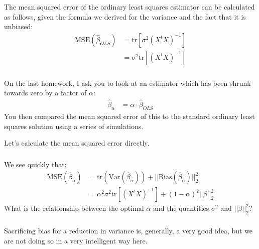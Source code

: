 \begin{frame}[fragile] \frametitle{}

The mean squared error of the ordinary least squares estimator can be
calculated as follows, given the formula we derived for the variance
and the fact that it is unbiased:
\begin{align*}
\text{MSE} (\widehat{\beta}_{OLS})
  &= \text{tr} \left[ \sigma^2 (X^t X)^{-1} \right] \\
  &= \sigma^2 \text{tr} \left[(X^t X)^{-1} \right]
\end{align*}

\end{frame}

\begin{frame}[fragile] \frametitle{}

On the last homework, I ask you to look at an estimator which
has been shrunk towards zero by a factor of $\alpha$:
\begin{align*}
\mathbb{\widehat{\beta}}_\alpha &= \alpha \cdot \widehat{\beta}_{OLS}
\end{align*}
You then compared the mean squared error of this to the standard
ordinary least squares solution using a series of simulations.

\pause Let's calculate the mean squared error directly.

\end{frame}

\begin{frame}[fragile] \frametitle{}

We see quickly that:
\begin{align*}
\text{MSE} (\widehat{\beta}_{\alpha})
  &= \text{tr} (\text{Var}(\widehat{\beta}_{\alpha})) + ||\text{Bias}(\widehat{\beta}_{\alpha}) ||_2^2 \\
  &= \alpha^2 \sigma^2 \text{tr} \left[(X^t X)^{-1} \right] + (1-\alpha)^2 ||\beta||_2^2
\end{align*}
\pause What is the relationship between the optimal $\alpha$ and the quantities
$\sigma^2$ and $||\beta||_2^2$?

\end{frame}

\begin{frame}[fragile] \frametitle{}

\large
Sacrificing bias for a reduction in variance is, generally, a very
good idea, but we are not doing so in a very intelligent way here.

\end{frame}

